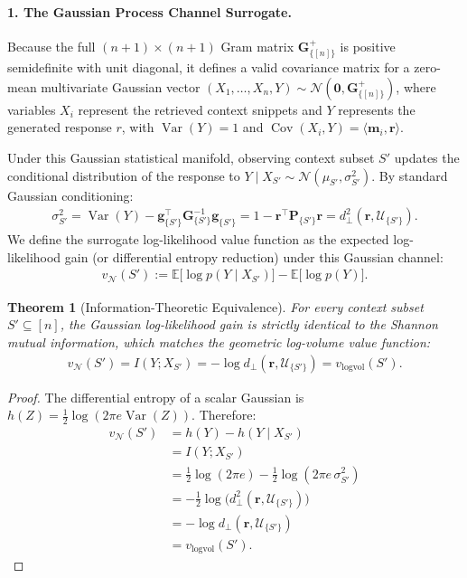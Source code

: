 \documentclass{article}
\newtheorem{theorem}{Theorem}
\begin{document}
\paragraph{1. The Gaussian Process Channel Surrogate.}
Because the full $(n+1) \times (n+1)$ Gram matrix $\mathbf{G}^{+}_{\{[n]\}}$ is positive semidefinite with unit diagonal, it defines a valid covariance matrix for a zero-mean multivariate Gaussian vector $(X_1, \dots, X_n, Y) \sim \mathcal{N}(\mathbf{0}, \mathbf{G}^{+}_{\{[n]\}})$, where variables $X_i$ represent the retrieved context snippets and $Y$ represents the generated response $r$, with $\operatorname{Var}(Y) = 1$ and $\operatorname{Cov}(X_i, Y) = \langle \mathbf{m}_i, \mathbf{r} \rangle$.

Under this Gaussian statistical manifold, observing context subset $S'$ updates the conditional distribution of the response to $Y \mid X_{S'} \sim \mathcal{N}(\mu_{S'}, \sigma^2_{S'})$. By standard Gaussian conditioning:
\begin{align}
    \sigma^2_{S'} = \operatorname{Var}(Y) - \mathbf{g}_{\{S'\}}^\top \mathbf{G}_{\{S'\}}^{-1} \mathbf{g}_{\{S'\}} = 1 - \mathbf{r}^\top \mathbf{P}_{\{S'\}} \mathbf{r} = d_{\perp}^2(\mathbf{r}, \mathcal{U}_{\{S'\}}).
\end{align}
We define the surrogate log-likelihood value function as the expected log-likelihood gain (or differential entropy reduction) under this Gaussian channel:
\begin{align}
    v_{\mathcal{N}}(S') := \mathbb{E}\big[\log p(Y \mid X_{S'})\big] - \mathbb{E}\big[\log p(Y)\big].
\end{align}

\begin{theorem}[Information-Theoretic Equivalence]\label{thm:gaussian_equivalence}
For every context subset $S' \subseteq [n]$, the Gaussian log-likelihood gain is strictly identical to the Shannon mutual information, which matches the geometric log-volume value function:
\begin{align}
    v_{\mathcal{N}}(S') = I(Y; X_{S'}) = -\log d_{\perp}(\mathbf{r}, \mathcal{U}_{\{S'\}}) = v_{\text{logvol}}(S').
\end{align}
\end{theorem}

\begin{proof}
The differential entropy of a scalar Gaussian is $h(Z) = \frac{1}{2}\log(2\pi e \operatorname{Var}(Z))$. Therefore:
\begin{align*}
    v_{\mathcal{N}}(S') &= h(Y) - h(Y \mid X_{S'}) \\
    &= I(Y; X_{S'}) \\
    &= \frac{1}{2}\log(2\pi e) - \frac{1}{2}\log(2\pi e \, \sigma^2_{S'}) \\
    &= -\frac{1}{2}\log\big(d_{\perp}^2(\mathbf{r}, \mathcal{U}_{\{S'\}})\big) \\
    &= -\log d_{\perp}(\mathbf{r}, \mathcal{U}_{\{S'\}}) \\
    &= v_{\text{logvol}}(S').
\end{align*}
\end{proof}
\end{document}
